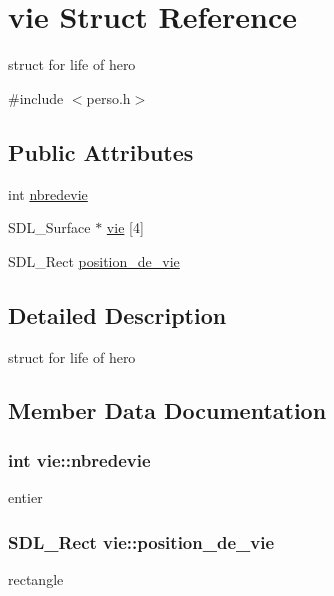\hypertarget{structvie}{}\section{vie Struct Reference}
\label{structvie}


struct for life of hero  




{\ttfamily \#include $<$perso.\+h$>$}

\subsection*{Public Attributes}
\begin{DoxyCompactItemize}
\item 
int \hyperlink{structvie_ace0f84a19ce4f5854ec56c137b33b947}{nbredevie}
\item 
S\+D\+L\+\_\+\+Surface $\ast$ \hyperlink{structvie_a2c29f60898de16e1306bd1043fa38dc9}{vie} \mbox{[}4\mbox{]}
\item 
S\+D\+L\+\_\+\+Rect \hyperlink{structvie_aaa37f269f7261984f2e540534210af5a}{position\+\_\+de\+\_\+vie}
\end{DoxyCompactItemize}


\subsection{Detailed Description}
struct for life of hero 

\subsection{Member Data Documentation}
\subsubsection[{\texorpdfstring{nbredevie}{nbredevie}}]{\setlength{\rightskip}{0pt plus 5cm}int vie\+::nbredevie}\hypertarget{structvie_ace0f84a19ce4f5854ec56c137b33b947}{}\label{structvie_ace0f84a19ce4f5854ec56c137b33b947}
entier 
\subsubsection[{\texorpdfstring{position\+\_\+de\+\_\+vie}{position_de_vie}}]{\setlength{\rightskip}{0pt plus 5cm}S\+D\+L\+\_\+\+Rect vie\+::position\+\_\+de\+\_\+vie}\hypertarget{structvie_aaa37f269f7261984f2e540534210af5a}{}\label{structvie_aaa37f269f7261984f2e540534210af5a}
rectangle 
